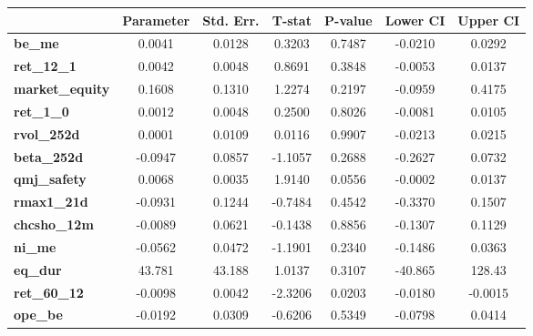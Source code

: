 \begin{tabular}{lcccccc}
\toprule
                        & \textbf{Parameter} & \textbf{Std. Err.} & \textbf{T-stat} & \textbf{P-value} & \textbf{Lower CI} & \textbf{Upper CI}  \\
\midrule
\textbf{be\_me}         &       0.0041       &       0.0128       &      0.3203     &      0.7487      &      -0.0210      &       0.0292       \\
\textbf{ret\_12\_1}     &       0.0042       &       0.0048       &      0.8691     &      0.3848      &      -0.0053      &       0.0137       \\
\textbf{market\_equity} &       0.1608       &       0.1310       &      1.2274     &      0.2197      &      -0.0959      &       0.4175       \\
\textbf{ret\_1\_0}      &       0.0012       &       0.0048       &      0.2500     &      0.8026      &      -0.0081      &       0.0105       \\
\textbf{rvol\_252d}     &       0.0001       &       0.0109       &      0.0116     &      0.9907      &      -0.0213      &       0.0215       \\
\textbf{beta\_252d}     &      -0.0947       &       0.0857       &     -1.1057     &      0.2688      &      -0.2627      &       0.0732       \\
\textbf{qmj\_safety}    &       0.0068       &       0.0035       &      1.9140     &      0.0556      &      -0.0002      &       0.0137       \\
\textbf{rmax1\_21d}     &      -0.0931       &       0.1244       &     -0.7484     &      0.4542      &      -0.3370      &       0.1507       \\
\textbf{chcsho\_12m}    &      -0.0089       &       0.0621       &     -0.1438     &      0.8856      &      -0.1307      &       0.1129       \\
\textbf{ni\_me}         &      -0.0562       &       0.0472       &     -1.1901     &      0.2340      &      -0.1486      &       0.0363       \\
\textbf{eq\_dur}        &       43.781       &       43.188       &      1.0137     &      0.3107      &      -40.865      &       128.43       \\
\textbf{ret\_60\_12}    &      -0.0098       &       0.0042       &     -2.3206     &      0.0203      &      -0.0180      &      -0.0015       \\
\textbf{ope\_be}        &      -0.0192       &       0.0309       &     -0.6206     &      0.5349      &      -0.0798      &       0.0414       \\

\end{tabular}
